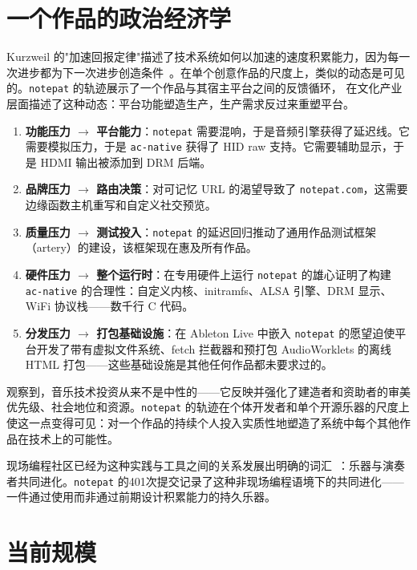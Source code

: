 \documentclass[10pt,letterpaper,twocolumn]{article}
\begin{document}
\section{一个作品的政治经济学}

Kurzweil 的"加速回报定律"描述了技术系统如何以加速的速度积累能力，因为每一次进步都为下一次进步创造条件~\citep{kurzweil2005singularity}。在单个创意作品的尺度上，类似的动态是可见的。\texttt{notepat} 的轨迹展示了一个作品与其宿主平台之间的反馈循环，\citet{nieborg2018platformization} 在文化产业层面描述了这种动态：平台功能塑造生产，生产需求反过来重塑平台。

\begin{enumerate}
  \item \textbf{功能压力 $\rightarrow$ 平台能力}：\texttt{notepat} 需要混响，于是音频引擎获得了延迟线。它需要模拟压力，于是 \texttt{ac-native} 获得了 HID raw 支持。它需要辅助显示，于是 HDMI 输出被添加到 DRM 后端。
  \item \textbf{品牌压力 $\rightarrow$ 路由决策}：对可记忆 URL 的渴望导致了 \texttt{notepat.com}，这需要边缘函数主机重写和自定义社交预览。
  \item \textbf{质量压力 $\rightarrow$ 测试投入}：\texttt{notepat} 的延迟回归推动了通用作品测试框架（artery）的建设，该框架现在惠及所有作品。
  \item \textbf{硬件压力 $\rightarrow$ 整个运行时}：在专用硬件上运行 \texttt{notepat} 的雄心证明了构建 \texttt{ac-native} 的合理性：自定义内核、initramfs、ALSA 引擎、DRM 显示、WiFi 协议栈——数千行 C 代码。
  \item \textbf{分发压力 $\rightarrow$ 打包基础设施}：在 Ableton Live 中嵌入 \texttt{notepat} 的愿望迫使平台开发了带有虚拟文件系统、fetch 拦截器和预打包 AudioWorklets 的离线 HTML 打包——这些基础设施是其他任何作品都未要求过的。
\end{enumerate}

\citet{born2015music} 观察到，音乐技术投资从来不是中性的——它反映并强化了建造者和资助者的审美优先级、社会地位和资源。\texttt{notepat} 的轨迹在个体开发者和单个开源乐器的尺度上使这一点变得可见：对一个作品的持续个人投入实质性地塑造了系统中每个其他作品在技术上的可能性。

现场编程社区已经为这种实践与工具之间的关系发展出明确的词汇~\citep{blackwell2022livecoding}：乐器与演奏者共同进化。\texttt{notepat} 的401次提交记录了这种非现场编程语境下的共同进化——一件通过使用而非通过前期设计积累能力的持久乐器。

\section{当前规模}
\end{document}

